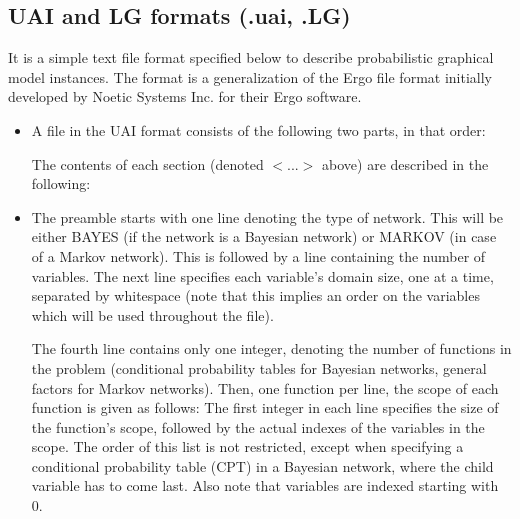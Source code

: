 \documentclass[letterpaper,10pt,openany,oneside,english]{sphinxmanual}
\begin{document}
\subsection{UAI and LG formats (.uai, .LG)}
\label{\detokenize{formats/uailgformat:uai-and-lg-formats-uai-lg}}\label{\detokenize{formats/uailgformat:uai-lg-format}}\label{\detokenize{formats/uailgformat::doc}}
\sphinxAtStartPar
It is a simple text file format specified below to describe probabilistic graphical model instances. The format is a generalization of the Ergo file format initially developed by Noetic Systems Inc. for their Ergo software.
\begin{itemize}
\item {} 
\sphinxAtStartPar
{}

\sphinxAtStartPar
A file in the UAI format consists of the following two parts, in that order:

\begin{sphinxVerbatim}[commandchars=\\\{\}]

 
\end{sphinxVerbatim}

\sphinxAtStartPar
The contents of each section (denoted \(<...>\) above) are described in the following:

\item {} 
\sphinxAtStartPar
{}

\sphinxAtStartPar
The preamble starts with one line denoting the type of network. This will be either BAYES (if the network is a Bayesian network) or MARKOV (in case of a Markov network). This is followed by a line containing the number of variables. The next line specifies each variable’s domain size, one at a time, separated by whitespace (note that this implies an order on the variables which will be used throughout the file).

\sphinxAtStartPar
The fourth line contains only one integer, denoting the number of functions in the problem (conditional probability tables for Bayesian networks, general factors for Markov networks). Then, one function per line, the scope of each function is given as follows: The first integer in each line specifies the size of the function’s scope, followed by the actual indexes of the variables in the scope. The order of this list is not restricted, except when specifying a conditional probability table (CPT) in a Bayesian network, where the child variable has to come last. Also note that variables are indexed starting with 0.


\end{itemize}
\end{document}

